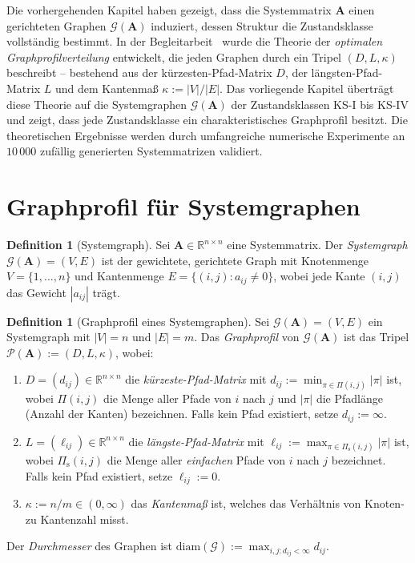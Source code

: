﻿\documentclass[12pt, a4paper, titlepage]{report}
\theoremstyle{definition}
\newtheorem{definition}[theorem]{Definition}
\theoremstyle{remark}
\newcommand{\R}{\mathbb{R}}
\newcommand{\vA}{\bm{A}}
\begin{document}
Die vorhergehenden Kapitel haben gezeigt, dass die Systemmatrix $\vA$ einen
gerichteten Graphen $\mathcal{G}(\vA)$ induziert, dessen Struktur die Zustandsklasse
vollständig bestimmt. In der Begleitarbeit~\citep{epp2026graphs} wurde die Theorie der
\emph{optimalen Graphprofilverteilung} entwickelt, die jeden Graphen durch ein
Tripel $(D, L, \kappa)$ beschreibt -- bestehend aus der kürzesten-Pfad-Matrix $D$,
der längsten-Pfad-Matrix $L$ und dem Kantenmaß $\kappa := |V|/|E|$.
Das vorliegende Kapitel überträgt diese Theorie auf die Systemgraphen
$\mathcal{G}(\vA)$ der Zustandsklassen KS-I bis KS-IV und zeigt, dass jede
Zustandsklasse ein charakteristisches Graphprofil besitzt. Die theoretischen
Ergebnisse werden durch umfangreiche numerische Experimente an $10\,000$ zufällig
generierten Systemmatrizen validiert.

\section{Graphprofil für Systemgraphen}

\begin{definition}[Systemgraph]
\label{def:systemgraph_gpv}
Sei $\vA \in \R^{n \times n}$ eine Systemmatrix. Der \emph{Systemgraph}
$\mathcal{G}(\vA) = (V, E)$ ist der gewichtete, gerichtete Graph mit
Knotenmenge $V = \{1, \ldots, n\}$ und Kantenmenge
$E = \{(i,j) : a_{ij} \neq 0\}$,
wobei jede Kante $(i,j)$ das Gewicht $|a_{ij}|$ trägt.
\end{definition}

\begin{definition}[Graphprofil eines Systemgraphen]
\label{def:graphprofil}
Sei $\mathcal{G}(\vA) = (V, E)$ ein Systemgraph mit $|V| = n$ und $|E| = m$.
Das \emph{Graphprofil} von $\mathcal{G}(\vA)$ ist das Tripel
$\mathcal{P}(\vA) := (D, L, \kappa)$, wobei:
\begin{enumerate}[label=(\roman*)]
  \item $D = (d_{ij}) \in \R^{n \times n}$ die \emph{kürzeste-Pfad-Matrix} mit
    $d_{ij} := \min_{\pi \in \Pi(i,j)} |\pi|$ ist, wobei $\Pi(i,j)$ die Menge aller
    Pfade von $i$ nach $j$ und $|\pi|$ die Pfadlänge (Anzahl der Kanten) bezeichnen.
    Falls kein Pfad existiert, setze $d_{ij} := \infty$.
  \item $L = (\ell_{ij}) \in \R^{n \times n}$ die \emph{längste-Pfad-Matrix} mit
    $\ell_{ij} := \max_{\pi \in \Pi_{\mathrm{s}}(i,j)} |\pi|$ ist, wobei
    $\Pi_{\mathrm{s}}(i,j)$ die Menge aller \emph{einfachen} Pfade von $i$ nach $j$
    bezeichnet. Falls kein Pfad existiert, setze $\ell_{ij} := 0$.
  \item $\kappa := n / m \in (0, \infty)$ das \emph{Kantenmaß} ist, welches das
    Verhältnis von Knoten- zu Kantenzahl misst.
\end{enumerate}
Der \emph{Durchmesser} des Graphen ist $\mathrm{diam}(\mathcal{G}) :=
\max_{i,j : d_{ij}<\infty} d_{ij}$.
\end{definition}
\end{document}
